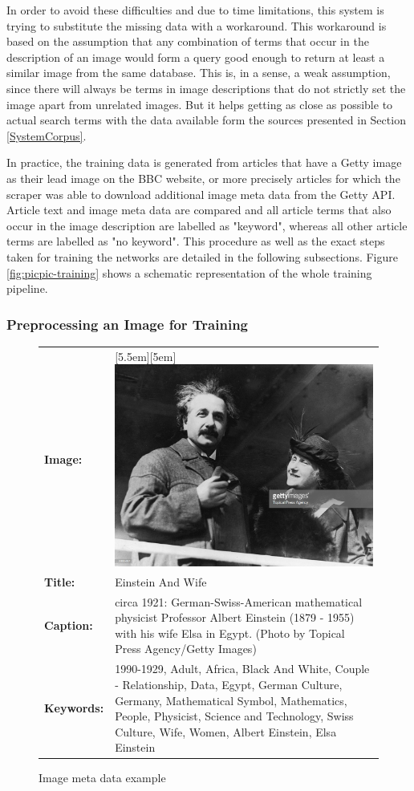 \documentclass[11pt,a4paper,twoside]{article}
\begin{document}
In order to avoid these difficulties and due to time limitations, this system is trying to substitute the missing data with a workaround. This workaround is based on the assumption that any combination of terms that occur in the description of an image would form a query good enough to return at least a similar image from the same database. This is, in a sense, a weak assumption, since there will always be terms in image descriptions that do not strictly set the image apart from unrelated images. But it helps getting as close as possible to actual search terms with the data available form the sources presented in Section \ref{SystemCorpus}.

In practice, the training data is generated from articles that have a Getty image as their lead image on the BBC website, or more precisely articles for which the scraper was able to download additional image meta data from the Getty API. Article text and image meta data are compared and all article terms that also occur in the image description are labelled as "keyword", whereas all other article terms are labelled as "no keyword". This procedure as well as the exact steps taken for training the networks are detailed in the following subsections. Figure \ref{fig:picpic-training} shows a schematic representation of the whole training pipeline.

\subsubsection{Preprocessing an Image for Training} \label{SystemTrainPreprocess}

\begin{figure}[t]
    \caption{Image meta data example}
    \centering
    \def\arraystretch{1.3}
    \begin{tabular}{l p{10cm}}
        \textbf{Image:} & \raisebox{-4.3em}[5.5em][5em]{\includegraphics[width=.3\columnwidth]{einstein.jpg}} \\
        \textbf{Title:} & Einstein And Wife \\
        \textbf{Caption:} & circa 1921:  German-Swiss-American mathematical physicist Professor Albert Einstein (1879 - 1955) with his wife Elsa in Egypt.  (Photo by Topical Press Agency/Getty Images) \\
        \textbf{Keywords:} & \nohyphens{1990-1929, Adult, Africa, Black And White, Couple - Relationship, Data, Egypt, German Culture, Germany, Mathematical Symbol, Mathematics, People, Physicist, Science and Technology, Swiss Culture, Wife, Women, Albert Einstein, Elsa Einstein} \\
    \end{tabular}
    \label{fig:image-meta-example}
\end{figure}
\end{document}
